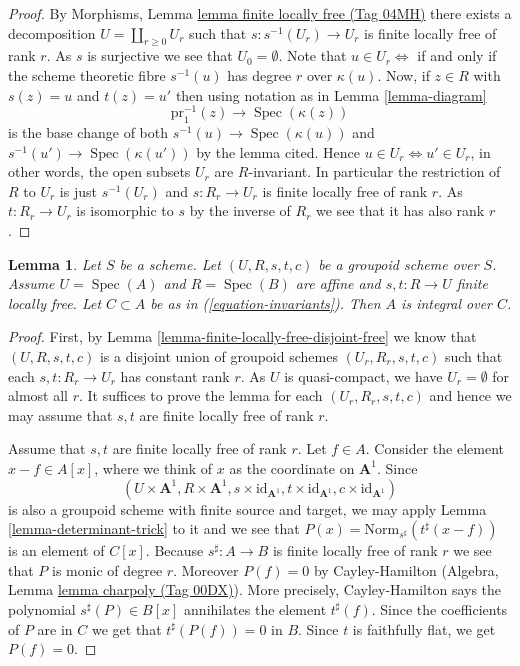 \documentclass{amsart}
\theoremstyle{plain}
\newtheorem{lemma}[subsection]{Lemma}
\theoremstyle{definition}
\theoremstyle{remark}
\numberwithin{equation}{subsection}
\def\Spec{\mathop{\mathrm{Spec}}}
\begin{document}
\begin{proof}
By
Morphisms, Lemma \href{https://stacks.math.columbia.edu/tag/04MH}{lemma finite locally free (Tag 04MH)}
there exists a decomposition
$U = \coprod\nolimits_{r \geq 0} U_r$
such that $s : s^{-1}(U_r) \to U_r$ is finite locally free of rank $r$.
As $s$ is surjective we see that $U_0 = \emptyset$.
Note that $u \in U_r \Leftrightarrow$ if and only if the scheme theoretic fibre
$s^{-1}(u)$ has degree $r$ over $\kappa(u)$. Now, if $z \in R$ with $s(z) = u$
and $t(z) = u'$ then using notation as in Lemma \ref{lemma-diagram}
$$
\text{pr}_1^{-1}(z) \to \Spec(\kappa(z))
$$
is the base change of both
$s^{-1}(u) \to \Spec(\kappa(u))$ and $s^{-1}(u') \to \Spec(\kappa(u'))$
by the lemma cited. Hence $u \in U_r \Leftrightarrow u' \in U_r$,
in other words, the open subsets $U_r$ are $R$-invariant.
In particular the restriction of $R$ to $U_r$ is just
$s^{-1}(U_r)$ and $s : R_r \to U_r$ is finite locally free of rank $r$.
As $t : R_r \to U_r$ is isomorphic to $s$ by the inverse of $R_r$
we see that it has also rank $r$.
\end{proof}


\begin{lemma}
\label{lemma-integral-over-invariants}
Let $S$ be a scheme. Let $(U, R, s, t, c)$ be a groupoid scheme over $S$.
Assume $U = \Spec(A)$ and $R = \Spec(B)$ are affine and
$s, t : R \to U$ finite locally free.
Let $C \subset A$ be as in (\ref{equation-invariants}).
Then $A$ is integral over $C$.
\end{lemma}

\begin{proof}
First, by Lemma \ref{lemma-finite-locally-free-disjoint-free}
we know that $(U, R, s, t, c)$ is a disjoint union
of groupoid schemes $(U_r, R_r, s, t, c)$ such that each $s, t : R_r \to U_r$
has constant rank $r$. As $U$ is quasi-compact, we have $U_r = \emptyset$ for
almost all $r$. It suffices to prove the lemma for each $(U_r, R_r, s, t, c)$
and hence we may assume that $s, t$ are finite locally free of rank $r$.

\medskip\noindent
Assume that $s, t$ are finite locally free of rank $r$.
Let $f \in A$. Consider the element $x - f \in A[x]$, where we think
of $x$ as the coordinate on $\mathbf{A}^1$.
Since
$$
(U \times \mathbf{A}^1, R \times \mathbf{A}^1,
s \times \text{id}_{\mathbf{A}^1},
t \times \text{id}_{\mathbf{A}^1},
c \times \text{id}_{\mathbf{A}^1})
$$
is also a groupoid scheme with finite source and target, we may apply
Lemma \ref{lemma-determinant-trick} to it and we see that
$P(x) = \text{Norm}_{s^\sharp}(t^\sharp(x - f))$
is an element of $C[x]$. Because $s^\sharp : A \to B$ is finite locally
free of rank $r$ we see that $P$ is monic of degree $r$.
Moreover $P(f) = 0$ by Cayley-Hamilton
(Algebra, Lemma \href{https://stacks.math.columbia.edu/tag/00DX}{lemma charpoly (Tag 00DX)}).
More precisely, Cayley-Hamilton says the polynomial
$s^\sharp(P) \in B[x]$ annihilates the element $t^\sharp(f)$.
Since the coefficients of $P$ are in $C$ we get that
$t^\sharp(P(f)) = 0$ in $B$. Since $t$ is faithfully flat,
we get $P(f) = 0$.
\end{proof}
\end{document}
